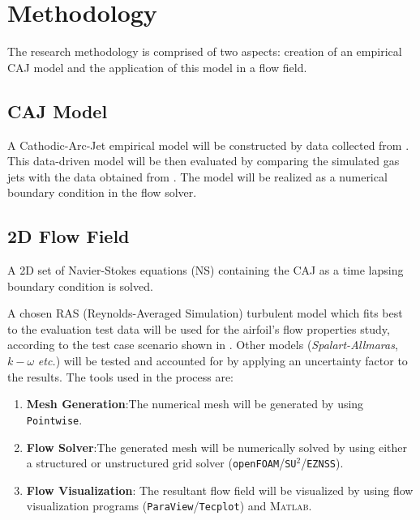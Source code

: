 \documentclass[10pt,a4paper]{article}
\begin{document}
\section{Methodology}
The research methodology is comprised of two aspects: creation of an empirical CAJ model and the application of this model in a flow field.
\subsection{CAJ Model}
A Cathodic-Arc-Jet empirical model will be constructed by data collected from \cite{KR}. This data-driven model will be then evaluated by comparing the simulated gas jets with the data obtained from \cite{KR}. The model will be realized as a numerical boundary condition in the flow solver.
\subsection{2D Flow Field}
A 2D set of Navier-Stokes equations (NS) containing the CAJ as a time lapsing boundary condition is solved.
\par A chosen RAS (Reynolds-Averaged Simulation) turbulent model which fits best to the evaluation test data will be used for the airfoil's flow properties study, according to the test case scenario shown in \cite{FLOWCTRL,KOK}. Other models (\textit{Spalart-Allmaras}, $k-\omega$ \textit{etc.}) will be tested and accounted for by applying an uncertainty factor to the results. The tools used in the process are:
\begin{enumerate}
	\item \textbf{Mesh Generation}:\quad The numerical mesh will be generated by using \texttt{Pointwise}.
    \item \textbf{Flow Solver}:\quad The generated mesh will be numerically solved by using either a structured or unstructured grid solver (\texttt{openFOAM}/\texttt{SU$^2$}/\texttt{EZNSS}).
    \item \textbf{Flow Visualization}: The resultant flow field will be visualized by using flow visualization programs (\texttt{ParaView}/\texttt{Tecplot}) and \textsc{Matlab}.
\end{enumerate}
\end{document}
